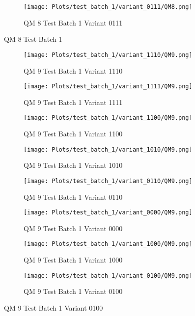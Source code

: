 \documentclass{DissertateFigs}
\begin{document}
\begin{figure}[t!]
\medskip

    \begin{subfigure}{0.38\textwidth}
    \texttt{[image: Plots/test\_batch\_1/variant\_0111/QM8.png]}
    \caption{QM 8 Test Batch 1 Variant 0111}
    \end{subfigure}
\caption{QM 8 Test Batch 1}
    \end{figure}
\clearpage
\begin{figure}[t!]
    \begin{subfigure}{0.47\textwidth}
    \texttt{[image: Plots/test\_batch\_1/variant\_1110/QM9.png]}
    \caption{QM 9 Test Batch 1 Variant 1110}
    \end{subfigure}
    \begin{subfigure}{0.47\textwidth}
    \texttt{[image: Plots/test\_batch\_1/variant\_1111/QM9.png]}
    \caption{QM 9 Test Batch 1 Variant 1111}
    \end{subfigure}

\medskip

    \begin{subfigure}{0.47\textwidth}
    \texttt{[image: Plots/test\_batch\_1/variant\_1100/QM9.png]}
    \caption{QM 9 Test Batch 1 Variant 1100}
    \end{subfigure}
    \begin{subfigure}{0.47\textwidth}
    \texttt{[image: Plots/test\_batch\_1/variant\_1010/QM9.png]}
    \caption{QM 9 Test Batch 1 Variant 1010}
    \end{subfigure}

\medskip

    \begin{subfigure}{0.47\textwidth}
    \texttt{[image: Plots/test\_batch\_1/variant\_0110/QM9.png]}
    \caption{QM 9 Test Batch 1 Variant 0110}
    \end{subfigure}
    \begin{subfigure}{0.47\textwidth}
    \texttt{[image: Plots/test\_batch\_1/variant\_0000/QM9.png]}
    \caption{QM 9 Test Batch 1 Variant 0000}
    \end{subfigure}

\medskip

    \begin{subfigure}{0.47\textwidth}
    \texttt{[image: Plots/test\_batch\_1/variant\_1000/QM9.png]}
    \caption{QM 9 Test Batch 1 Variant 1000}
    \end{subfigure}
    \begin{subfigure}{0.47\textwidth}
    \texttt{[image: Plots/test\_batch\_1/variant\_0100/QM9.png]}
    \caption{QM 9 Test Batch 1 Variant 0100}
    \end{subfigure}


\end{figure}
\end{document}
